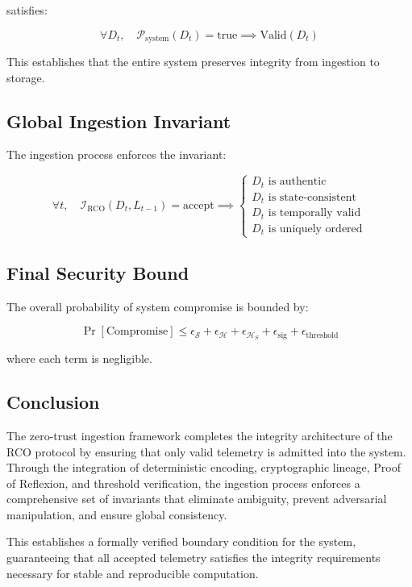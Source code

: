 satisfies:

\begin{equation}
\forall D_t, \quad \mathcal{P}_{\text{system}}(D_t) = \text{true} \implies \text{Valid}(D_t)
\end{equation}

This establishes that the entire system preserves integrity from ingestion to storage.

\subsection{Global Ingestion Invariant}

The ingestion process enforces the invariant:

\begin{equation}
\forall t, \quad \mathcal{I}_{\text{RCO}}(D_t, L_{t-1}) = \text{accept} \implies
\begin{cases}
D_t \text{ is authentic} \\
D_t \text{ is state-consistent} \\
D_t \text{ is temporally valid} \\
D_t \text{ is uniquely ordered}
\end{cases}
\end{equation}

\subsection{Final Security Bound}

The overall probability of system compromise is bounded by:

\begin{equation}
\Pr[\text{Compromise}] \leq \epsilon_{\mathcal{S}} + \epsilon_{\mathcal{H}} + \epsilon_{\mathcal{H}_S} + \epsilon_{\text{sig}} + \epsilon_{\text{threshold}}
\end{equation}

where each term is negligible.

\subsection{Conclusion}

The zero-trust ingestion framework completes the integrity architecture of the RCO protocol by ensuring that only valid telemetry is admitted into the system. Through the integration of deterministic encoding, cryptographic lineage, Proof of Reflexion, and threshold verification, the ingestion process enforces a comprehensive set of invariants that eliminate ambiguity, prevent adversarial manipulation, and ensure global consistency.

This establishes a formally verified boundary condition for the system, guaranteeing that all accepted telemetry satisfies the integrity requirements necessary for stable and reproducible computation.